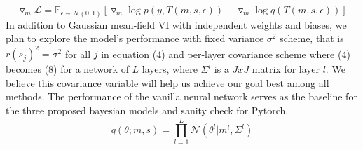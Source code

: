 \documentclass{article}
\begin{document}
\begin{equation}
    \triangledown_m \mathcal{L} = \mathbb{E}_{\epsilon \sim\mathcal{N}(0, 1)}[\triangledown_m \log{p(y, T(m, s, \epsilon))} - \triangledown_m \log{q(T(m,s,\epsilon))}]
\end{equation}
In addition to Gaussian mean-field VI with independent weights and biases, we plan to explore the model’s performance with fixed variance $\sigma^2$ scheme, that is $r(s_j)^2 = \sigma^2 $ for all $j$ in equation (4) and per-layer covariance scheme where (4) becomes (8) for a network of $L$ layers, where $\Sigma^l$ is a $JxJ$ matrix for layer $l$. We believe this covariance variable will help us achieve our goal best among all methods. The performance of the vanilla neural network serves as the baseline for the three proposed bayesian models and sanity check for Pytorch.
\begin{equation}
    q(\theta; m,s) = \prod_{l=1}^L \mathcal{N}(\theta^l| m^l, \Sigma^l)
\end{equation}
\end{document}
